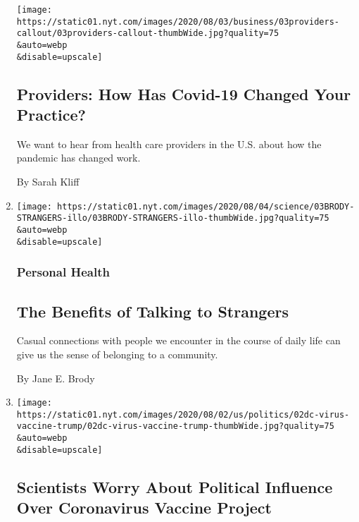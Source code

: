 \begin{enumerate}
  \texttt{[image: https://static01.nyt.com/images/2020/08/03/business/03providers-callout/03providers-callout-thumbWide.jpg?quality=75\\\&auto=webp\\\&disable=upscale]}

  \hypertarget{providers-how-has-covid-19-changed-your-practice}{%
  \subsection{Providers: How Has Covid-19 Changed Your
  Practice?}\label{providers-how-has-covid-19-changed-your-practice}}

  We want to hear from health care providers in the U.S. about how the
  pandemic has changed work.

  By Sarah Kliff
\item
  \href{/2020/08/03/well/family/the-benefits-of-talking-to-strangers.html}{}

  \texttt{[image: https://static01.nyt.com/images/2020/08/04/science/03BRODY-STRANGERS-illo/03BRODY-STRANGERS-illo-thumbWide.jpg?quality=75\\\&auto=webp\\\&disable=upscale]}

  \hypertarget{personal-health}{%
  \subsubsection{Personal Health}\label{personal-health}}

  \hypertarget{the-benefits-of-talking-to-strangers-1}{%
  \subsection{The Benefits of Talking to
  Strangers}\label{the-benefits-of-talking-to-strangers-1}}

  Casual connections with people we encounter in the course of daily
  life can give us the sense of belonging to a community.

  By Jane E. Brody
\item
  \href{/2020/08/02/us/politics/coronavirus-vaccine.html}{}

  \texttt{[image: https://static01.nyt.com/images/2020/08/02/us/politics/02dc-virus-vaccine-trump/02dc-virus-vaccine-trump-thumbWide.jpg?quality=75\\\&auto=webp\\\&disable=upscale]}

  \hypertarget{scientists-worry-about-political-influence-over-coronavirus-vaccine-project}{%
  \subsection{Scientists Worry About Political Influence Over
  Coronavirus Vaccine
  Project}\label{scientists-worry-about-political-influence-over-coronavirus-vaccine-project}}


\end{enumerate}
